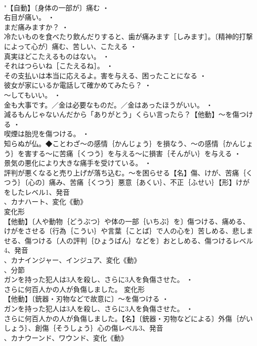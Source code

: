 \documentclass[8pt]{extreport}
\begin{document}
\begin{CJK}{UTF8}{min}
\\	"【自動】〔身体の一部が〕痛む ・
\\	右目が痛い。 ・
\\	まだ痛みますか？ ・
\\	冷たいものを食べたり飲んだりすると、歯が痛みます［しみます］。〔精神的打撃によって心が〕痛む、苦しい、こたえる ・
\\	真実ほどこたえるものはない。 ・
\\	それはつらいね［こたえるね］。 ・
\\	その支払いは本当に応えるよ。害を与える、困ったことになる ・
\\	彼女が家にいるか電話して確かめてみたら？ ・
\\	～してもいい。 ・
\\	金も大事です。／金は必要なものだ。／金はあったほうがいい。 ・
\\	減るもんじゃないんだから「ありがとう」くらい言ったら？【他動】～を傷つける ・
\\	喫煙は胎児を傷つける。 ・
\\	知らぬが仏。◆ことわざ～の感情｛かんじょう｝を損なう、～の感情｛かんじょう｝を害する～に苦痛｛くつう｝を与える～に損害｛そんがい｝を与える ・
\\	景気の悪化により大きな痛手を受けている。 ・
\\	評判が悪くなると売り上げが落ち込む。～を困らせる【名】傷、けが、苦痛｛くつう｝〔心の〕痛み、苦痛｛くつう｝悪意｛あくい｝、不正｛ふせい｝【形】けがをしたレベル1、発音
\\	、カナハート、変化《動》
\\	変化形 
\\	【他動】〔人や動物｛どうぶつ｝や体の一部｛いちぶ｝を〕傷つける、痛める、けがをさせる〔行為｛こうい｝や言葉｛ことば｝で人の心を〕苦しめる、悲しませる、傷つける〔人の評判｛ひょうばん｝などを〕おとしめる、傷つけるレベル4、発音
\\	、カナインジャー、インジュア、変化《動》
\\	、分節
\\	ガンを持った犯人は3人を殺し、さらに3人を負傷させた。 ・
\\	さらに何百人かの人が負傷しました。	変化形 
\\	【他動】〔銃器・刃物などで故意に〕～を傷つける ・
\\	ガンを持った犯人は3人を殺し、さらに3人を負傷させた。 ・
\\	さらに何百人かの人が負傷しました。【名】〔銃器・刃物などによる〕外傷｛がいしょう｝、創傷｛そうしょう｝心の傷レベル3、発音
\\	、カナウーンド、ワウンド、変化《動》

\end{CJK}
\end{document}
